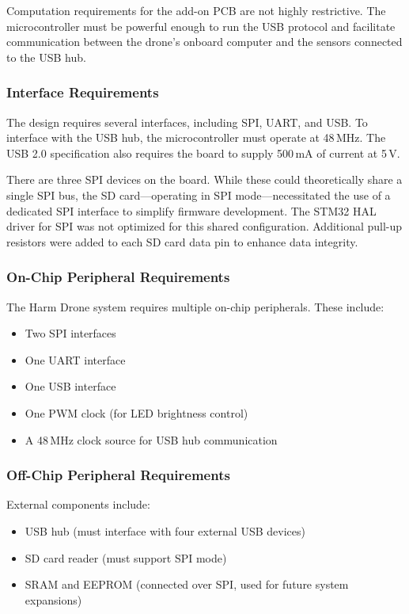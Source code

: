 \documentclass[12pt]{article}
\begin{document}
Computation requirements for the add-on PCB are not highly restrictive. The microcontroller must be powerful enough to run the USB protocol and facilitate communication between the drone’s onboard computer and the sensors connected to the USB hub.

\subsubsection{Interface Requirements}

\par The design requires several interfaces, including SPI, UART, and USB. To interface with the USB hub, the microcontroller must operate at 48\,MHz. The USB 2.0 specification also requires the board to supply 500\,mA of current at 5\,V.

\par There are three SPI devices on the board. While these could theoretically share a single SPI bus, the SD card—operating in SPI mode—necessitated the use of a dedicated SPI interface to simplify firmware development. The STM32 HAL driver for SPI was not optimized for this shared configuration. Additional pull-up resistors were added to each SD card data pin to enhance data integrity.

\subsubsection{On-Chip Peripheral Requirements}

The Harm Drone system requires multiple on-chip peripherals. These include:
\begin{itemize}
    \item Two SPI interfaces
    \item One UART interface
    \item One USB interface
    \item One PWM clock (for LED brightness control)
    \item A 48\,MHz clock source for USB hub communication
\end{itemize}

\subsubsection{Off-Chip Peripheral Requirements}

External components include:
\begin{itemize}
    \item USB hub (must interface with four external USB devices)
    \item SD card reader (must support SPI mode)
    \item SRAM and EEPROM (connected over SPI, used for future system expansions)
\end{itemize}
\end{document}
